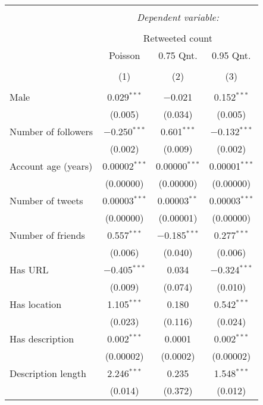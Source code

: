 
\begin{table}[!htbp] \centering 
  \caption{} 
  \label{} 
\begin{tabular}{@{\extracolsep{5pt}}lccc} 
\\[-1.8ex]\hline 
\hline \\[-1.8ex] 
 & \multicolumn{3}{c}{\textit{Dependent variable:}} \\ 
\cline{2-4} 
\\[-1.8ex] & \multicolumn{3}{c}{Retweeted count} \\ 
 & Poisson & 0.75 Qnt. & 0.95 Qnt. \\ 
\\[-1.8ex] & (1) & (2) & (3)\\ 
\hline \\[-1.8ex] 
 Male & 0.029$^{***}$ & $-$0.021 & 0.152$^{***}$ \\ 
  & (0.005) & (0.034) & (0.005) \\ 
  Number of followers & $-$0.250$^{***}$ & 0.601$^{***}$ & $-$0.132$^{***}$ \\ 
  & (0.002) & (0.009) & (0.002) \\ 
  Account age (years) & 0.00002$^{***}$ & 0.00000$^{***}$ & 0.00001$^{***}$ \\ 
  & (0.00000) & (0.00000) & (0.00000) \\ 
  Number of tweets & 0.00003$^{***}$ & 0.00003$^{**}$ & 0.00003$^{***}$ \\ 
  & (0.00000) & (0.00001) & (0.00000) \\ 
  Number of friends & 0.557$^{***}$ & $-$0.185$^{***}$ & 0.277$^{***}$ \\ 
  & (0.006) & (0.040) & (0.006) \\ 
  Has URL & $-$0.405$^{***}$ & 0.034 & $-$0.324$^{***}$ \\ 
  & (0.009) & (0.074) & (0.010) \\ 
  Has location & 1.105$^{***}$ & 0.180 & 0.542$^{***}$ \\ 
  & (0.023) & (0.116) & (0.024) \\ 
  Has description & 0.002$^{***}$ & 0.0001 & 0.002$^{***}$ \\ 
  & (0.00002) & (0.0002) & (0.00002) \\ 
  Description length & 2.246$^{***}$ & 0.235 & 1.548$^{***}$ \\ 
  & (0.014) & (0.372) & (0.012) \\ 

\end{tabular}
\end{table}
